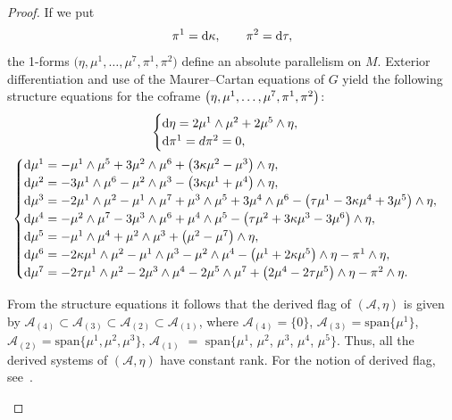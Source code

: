 \documentclass[pdftex]{sigma}
\numberwithin{equation}{section}
\begin{document}
\begin{proof}
If we put
\[
 \pi^1={\rm d}\kappa,\qquad \pi^2={\rm d}\tau,
\]
the 1-forms $\big(\eta,\mu^1,\dots,\mu^7,\pi^1,\pi^2\big)$ define an absolute parallelism on $M$.
%
Exterior differentiation and use of the Maurer--Cartan equations of ${G}$ yield the following structure equations
for the coframe $\big(\eta,\mu^1,\mathellipsis,\mu^7,\pi^1,\pi^2\big)$:
\begin{gather}\label{quadratic1}
\begin{cases}
{\rm d}\eta =2\mu^1\wedge\mu^2+2\mu^5\wedge\eta,\\
{\rm d}\pi^1=d\pi^2=0,\\
\end{cases}
\\
\label{quadratic2}
\begin{cases}
{\rm d}\mu^1=-\mu^1\wedge\mu^5+3\mu^2\wedge\mu^6+\big(3\kappa\mu^2-\mu^3\big)\wedge\eta,	\\
{\rm d}\mu^2=-3\mu^1\wedge\mu^6 - \mu^2\wedge\mu^3 - \big(3\kappa\mu^1+ \mu^4\big)\wedge\eta,	\\
{\rm d}\mu^3=-2\mu^1\wedge\mu^2-\mu^1\wedge\mu^7+\mu^3\wedge\mu^5+3\mu^4\wedge\mu^6  - \big(\tau\mu^1- 3\kappa\mu^4+3\mu^5\big)\wedge\eta,	\\
{\rm d}\mu^4=-\mu^2\wedge\mu^7- 3\mu^3\wedge\mu^6+\mu^4\wedge\mu^5 - \big(\tau\mu^2+ 3\kappa\mu^3-3\mu^6\big)\wedge\eta, \\
{\rm d}\mu^5=-\mu^1\wedge\mu^4+\mu^2\wedge\mu^3 + \big(\mu^2-\mu^7\big)\wedge\eta,	\\
{\rm d}\mu^6=-2\kappa\mu^1\wedge\mu^2-\mu^1\wedge\mu^3-\mu^2\wedge\mu^4 - \big(\mu^1+ 2\kappa\mu^5\big)\wedge\eta - \pi^1\wedge\eta,	\\
{\rm d}\mu^7=-2\tau\mu^1\wedge\mu^2-2\mu^3\wedge\mu^4-2\mu^5\wedge\mu^7  + \big(2\mu^4- 2\tau\mu^5\big)\wedge\eta - \pi^2\wedge\eta.	\\
\end{cases}
\end{gather}

\begin{Remark}\label{r:derived-flags}
From the structure equations it follows that the derived flag of $(\mathcal{A},\eta)$ is given by
$\mathcal{A}_{(4)} \subset \mathcal{A}_{ (3) } \subset \mathcal{A}_{ (2)} \subset \mathcal{A}_{ (1)}$, where
$\mathcal{A}_{(4)} = \{0\}$, $\mathcal{A}_{ (3) }= \text{span}\big\{\mu^1\big\}$, $\mathcal{A}_{ (2)} = \text{span}\big\{\mu^1,\mu^2,\mu^3\big\}$,
$\mathcal{A}_{ (1)}$ $=$ $\text{span}\big\{\mu^1$, $\mu^2$, $\mu^3$, $\mu^4$, $\mu^5\big\}$.
Thus, all the derived systems of $(\mathcal{A},\eta)$ have constant rank. For the notion of derived flag, see~\cite{Gr}.
\end{Remark}


\end{proof}
\end{document}
